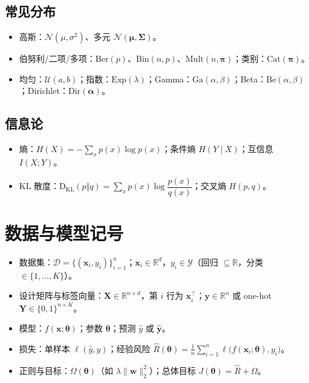 \documentclass[UTF8,zihao=-4]{ctexart}
\newcommand{\R}{\mathbb{R}}
\newcommand{\KL}{\mathrm{D}_{\mathrm{KL}}}
\newcommand{\1}{\mathbf{1}}
\newcommand{\0}{\mathbf{0}}
\begin{document}
\subsection{常见分布}
\begin{itemize}
  \item 高斯：$\mathcal{N}(\mu,\sigma^2)$、多元 $\mathcal{N}(\bm{\mu},\bm{\Sigma})$。
  \item 伯努利/二项/多项：$\mathrm{Ber}(p)$、$\mathrm{Bin}(n,p)$、$\mathrm{Mult}(n,\bm{\pi})$；类别：$\mathrm{Cat}(\bm{\pi})$。
  \item 均匀：$\mathcal{U}(a,b)$；指数：$\mathrm{Exp}(\lambda)$；Gamma：$\mathrm{Ga}(\alpha,\beta)$；Beta：$\mathrm{Be}(\alpha,\beta)$；Dirichlet：$\mathrm{Dir}(\bm{\alpha})$。
\end{itemize}

\subsection{信息论}
\begin{itemize}
  \item 熵：$H(X)=-\sum_x p(x)\log p(x)$；条件熵 $H(Y\mid X)$；互信息 $I(X;Y)$。
  \item KL 散度：$\KL(p\Vert q)=\sum_x p(x)\log\dfrac{p(x)}{q(x)}$；交叉熵 $H(p,q)$。
\end{itemize}

\section{数据与模型记号}
\begin{itemize}
  \item 数据集：$\mathcal{D}=\{(\bm{x}_i,y_i)\}_{i=1}^n$；$\bm{x}_i\in\R^d$，$y_i\in\mathcal{Y}$（回归 $\subseteq\R$，分类 $\in\{1,\dots,K\}$）。
  \item 设计矩阵与标签向量：$\bm{X}\in\R^{n\times d}$，第 $i$ 行为 $\bm{x}_i^\top$；$\bm{y}\in\R^n$ 或 one-hot $\bm{Y}\in\{0,1\}^{n\times K}$。
  \item 模型：$f(\bm{x};\bm{\theta})$；参数 $\bm{\theta}$；预测 $\hat{y}$ 或 $\hat{\bm{y}}$。
  \item 损失：单样本 $\ell(\hat{y},y)$；经验风险 $\hat{R}(\bm{\theta})=\tfrac{1}{n}\sum_{i=1}^n \ell\big(f(\bm{x}_i;\bm{\theta}),y_i\big)$。
  \item 正则与目标：$\Omega(\bm{\theta})$（如 $\lambda\lVert\bm{w}\rVert_2^2$）；总体目标 $J(\bm{\theta})=\hat{R}+\Omega$。
\end{itemize}
\end{document}
